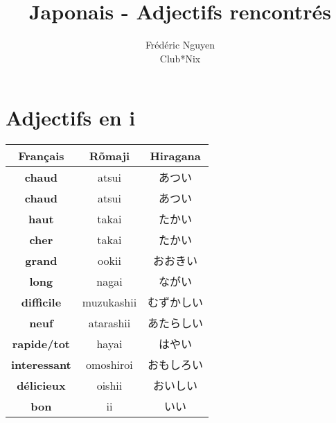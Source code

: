 \documentclass[11pt]{report}
\title{Japonais - Adjectifs rencontrés}
\author{
	Frédéric Nguyen \\ Club*Nix
}
\newenvironment{Japanese}{%
\CJKfamily{min}%
\CJKtilde  
\CJKnospace}{}
\begin{document}
\maketitle
\tableofcontents

\chapter{Adjectifs en i}

\begin{CJK}{UTF8}{}  
\begin{Japanese}
	\begin{center}
		\begin{multicols}{2}
			\begin{tabular}{|c|c|c|}
				\hline
				\textbf{Français} & \textbf{Rõmaji} & \textbf{Hiragana} \\
				\hline
				\textbf{chaud} & atsui & あつい \\%
				\hline
				\textbf{chaud} & atsui & あつい \\%
				\hline
				\textbf{haut} & takai & たかい \\%
				\hline
				\textbf{cher} & takai & たかい \\%
				\hline
				\textbf{grand} & ookii & おおきい \\%
				\hline
				\textbf{long} & nagai & ながい \\%
				\hline
				\textbf{difficile} & muzukashii & むずかしい \\%
				\hline
				\textbf{neuf} & atarashii & あたらしい \\%
				\hline
				\textbf{rapide/tot} & hayai & はやい \\%
				\hline
				\textbf{interessant} & omoshiroi & おもしろい \\%
				\hline
				\textbf{délicieux} & oishii & おいしい \\%
				\hline
				\textbf{bon} & ii & いい \\%
				\hline


\end{tabular}
\end{multicols}
\end{center}
\end{Japanese}
\end{CJK}
\end{document}
